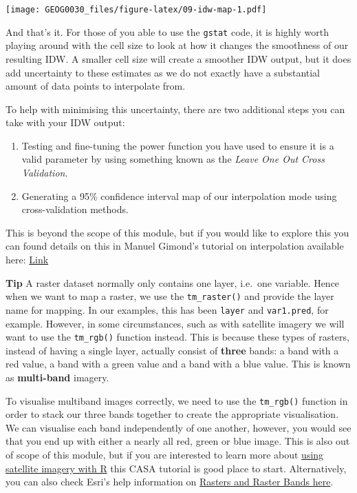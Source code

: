 \documentclass[
]{book}
\begin{document}
\texttt{[image: GEOG0030\_files/figure-latex/09-idw-map-1.pdf]}

And that's it. For those of you able to use the \texttt{gstat} code, it is highly worth playing around with the cell size to look at how it changes the smoothness of our resulting IDW. A smaller cell size will create a smoother IDW output, but it does add uncertainty to these estimates as we do not exactly have a substantial amount of data points to interpolate from.

To help with minimising this uncertainty, there are two additional steps you can take with your IDW output:

\begin{enumerate}
\def\labelenumi{\arabic{enumi})}
\item
  Testing and fine-tuning the power function you have used to ensure it is a valid parameter by using something known as the \emph{Leave One Out Cross Validation}.
\item
  Generating a 95\% confidence interval map of our interpolation mode using cross-validation methods.
\end{enumerate}

This is beyond the scope of this module, but if you would like to explore this you can found details on this in Manuel Gimond's tutorial on interpolation available here: \href{https://mgimond.github.io/Spatial/interpolation-in-r.html}{Link}

\textbf{Tip}
A raster dataset normally only contains one layer, i.e.~one variable. Hence when we want to map a raster, we use the \texttt{tm\_raster()} and provide the layer name for mapping. In our examples, this has been \texttt{layer} and \texttt{var1.pred}, for example. However, in some circumstances, such as with satellite imagery we will want to use the \texttt{tm\_rgb()} function instead. This is because these types of rasters, instead of having a single layer, actually consist of \textbf{three} bands: a band with a red value, a band with a green value and a band with a blue value. This is known as \textbf{multi-band} imagery.

To visualise multiband images correctly, we need to use the \texttt{tm\_rgb()} function in order to stack our three bands together to create the appropriate visualisation. We can visualise each band independently of one another, however, you would see that you end up with either a nearly all red, green or blue image. This is also out of scope of this module, but if you are interested to learn more about \href{https://andrewmaclachlan.github.io/CASA0005repo/advanced-raster-analysis.html}{using satellite imagery with R} this CASA tutorial is good place to start. Alternatively, you can also check Esri's help information on \href{https://desktop.arcgis.com/en/arcmap/10.3/manage-data/raster-and-images/raster-bands.html}{Rasters and Raster Bands here}.
\end{document}
